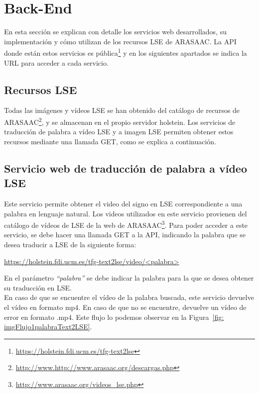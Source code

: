 \section{Back-End}

En esta sección se explican con detalle los servicios web desarrollados, su implementación y cómo utilizan de los recursos LSE de ARASAAC. La API donde están estos servicios es pública\footnote{\url{https://holstein.fdi.ucm.es/tfg-text2lse}} y en los siguientes apartados se indica la URL para acceder a cada servicio.


\subsection{Recursos LSE}

Todas las imágenes y vídeos LSE se han obtenido del catálogo de recursos de ARASAAC\footnote{\url{http://www.http://www.arasaac.org/descargas.php}}, y se almacenan en el propio servidor holstein. Los servicios de traducción de palabra a vídeo LSE y a imagen LSE permiten obtener estos recursos mediante una llamada GET, como se explica a continuación.

\subsection{Servicio web de traducción de palabra a vídeo LSE }

Este servicio permite obtener el video del signo en LSE correspondiente a una palabra en lenguaje natural. Los videos utilizados en este servicio provienen del catálogo de vídeos de LSE de la web de ARASAAC\footnote{\url{http://www.arasaac.org/videos_lse.php}}. Para poder acceder a este servicio, se debe hacer una llamada GET a la API,  indicando la palabra que se desea traducir a LSE de la siguiente forma:\\

\begin{shaded}
	\url{https://holstein.fdi.ucm.es/tfg-text2lse/video/<palabra> }	
\end{shaded}

En el parámetro \textit{``palabra''} se debe indicar la palabra para la que se desea obtener su traducción en LSE. \\

En caso de que se encuentre el vídeo de la palabra buscada, este servicio devuelve el vídeo en formato mp4. En caso de que no se encuentre, devuelve un vídeo de error en formato .mp4. Este flujo lo podemos observar en la Figura~\ref {fig: imgFlujo1palabraText2LSE}. \\

